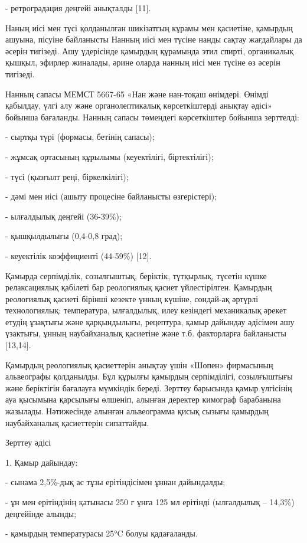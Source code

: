 \begin{multicols}{2}
- ретроградация деңгейі анықталды {[}11{]}.

Наның иісі мен түсі қолданылған шикізатгың кұрамы мен қасиетіне,
қамырдың ашуына, пісуіне байланысты Нанның иісі мен түсіне нанды сақтау
жағдайлары да әсерін тигізеді. Ашу үдерісінде қамырдың құрамында этил
спирті, органикалық қышқыл, эфирлер жиналады, әрине оларда нанның иісі
мен түсіне өз әсерін тигізеді.

Нанның сапасы МЕМСТ 5667-65 «Нан және нан-тоқаш өнімдері. Өнімді
қабылдау, үлгі алу және органолептикалық көрсеткіштерді анықтау әдісі»
бойынша бағаланды. Нанның сапасы төмендегі көрсеткіштер бойынша
зерттелді:

- сыртқы түрі (формасы, бетінің сапасы);

- жұмсақ ортасының құрылымы (кеуектілігі, біртектілігі);

- түсі (қызғылт реңі, біркелкілігі);

- дәмі мен иісі (ашыту процесіне байланысты өзгерістері);

- ылғалдылық деңгейі (36-39\%);

- қышқылдылығы (0,4-0,8 град);

- кеуектілік коэффициенті (44-59\%) {[}12{]}.

Қамырда серпімділік, созылғыштық, беріктік, түтқырлық, түсетін күшке
релаксациялық қабілеті бар реологиялық қасиет үйлестірілген. Қамырдың
реологиялық қасиеті бірінші кезекте үнның күшіне, сондай-ақ әртүрлі
технологиялық: температура, ылғалдылық, илеу кезіндегі механикалық
әрекет етудің ұзақтығы және қарқындылығы, рецептура, қамыр дайындау
әдісімен ашу үзактығы, ұнның наубайханалық қасиетіне және т.б.
факторларға байланысты {[}13,14{]}.

Қамырдың реологиялық қасиеттерін анықтау үшін «Шопен» фирмасының
альвеографы қолданылды. Бұл құрылғы қамырдың серпімділігі, созылғыштығы
және беріктігін бағалауға мүмкіндік береді. Зерттеу барысында қамыр
үлгісінің ауа қысымына қарсылығы өлшеніп, алынған деректер кимограф
барабанына жазылады. Нәтижесінде алынған альвеограмма қисық сызығы
қамырдың наубайханалық қасиеттерін сипаттайды.

Зерттеу әдісі

1. Қамыр дайындау:

- сынама 2,5\%-дық ас тұзы ерітіндісімен ұннан дайындалды;

- ұн мен ерітіндінің қатынасы 250 г ұнға 125 мл ерітінді (ылғалдылық --
14,3\%) деңгейінде алынды;

- қамырдың температурасы 25°C болуы қадағаланды.


\end{multicols}
